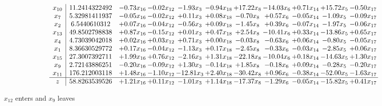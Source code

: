 \documentclass[9pt]{article}
\begin{document}
 \[\begin{array}{c| c c@{\hskip 2pt} c@{\hskip 2pt} c@{\hskip 2pt} c@{\hskip 2pt} c@{\hskip 2pt} c@{\hskip 2pt} c@{\hskip 2pt} c@{\hskip 2pt} c@{\hskip 2pt} }
 x_{10}   &  11.2414322492 & -0.73 x_{16} & -0.02 x_{12} & -1.93 x_{3} & -0.94 x_{18} & + 17.22 x_{8} & -14.03 x_{6} & +  0.71 x_{14} & + 15.72 x_{5} & -0.50 x_{17}\\
 x_{7}   &  5.32981411937 & -0.05 x_{16} & -0.02 x_{12} & +  0.11 x_{3} & +  0.08 x_{18} & -0.70 x_{8} & +  0.57 x_{6} & -0.05 x_{14} & -1.09 x_{5} & -0.09 x_{17}\\
 x_{2}   &  6.5440610312 & +  0.07 x_{16} & -0.04 x_{12} & -0.56 x_{3} & +  0.09 x_{18} & -1.45 x_{8} & +  0.39 x_{6} & -0.07 x_{14} & -1.97 x_{5} & -0.06 x_{17}\\
 x_{13}   &  49.8502798838 & +  0.87 x_{16} & -0.15 x_{12} & +  0.01 x_{3} & +  0.47 x_{18} & +  2.54 x_{8} & -10.41 x_{6} & +  0.33 x_{14} & -13.86 x_{5} & +  0.65 x_{17}\\
 x_{4}   &  4.73039042018 & +  0.02 x_{16} & +  0.03 x_{12} & +  0.71 x_{3} & +  0.00 x_{18} & -0.03 x_{8} & -0.63 x_{6} & +  0.06 x_{14} & -0.80 x_{5} & -0.05 x_{17}\\
 x_{1}   &  8.36630529772 & +  0.17 x_{16} & -0.04 x_{12} & -1.13 x_{3} & +  0.17 x_{18} & -2.45 x_{8} & -0.33 x_{6} & -0.03 x_{14} & -2.85 x_{5} & +  0.06 x_{17}\\
 x_{15}   &  27.3007392711 & +  1.99 x_{16} & +  0.76 x_{12} & -2.16 x_{3} & +  1.31 x_{18} & -22.18 x_{8} & -10.04 x_{6} & +  0.18 x_{14} & -14.63 x_{5} & +  1.30 x_{17}\\
 x_{9}   &  2.72143886251 & -0.20 x_{16} & -0.09 x_{12} & +  1.30 x_{3} & -0.14 x_{18} & +  1.85 x_{8} & -0.18 x_{6} & +  0.09 x_{14} & -0.28 x_{5} & -0.20 x_{17}\\
 x_{11}   &  176.212003118 & +  1.48 x_{16} & -1.10 x_{12} & -12.81 x_{3} & +  2.40 x_{18} & -30.42 x_{8} & +  0.96 x_{6} & -0.38 x_{14} & -52.00 x_{5} & -1.63 x_{17}\\
\hline
z    &  58.8263539526 & +  1.21 x_{16} & +  0.11 x_{12} & -1.01 x_{3} & +  1.14 x_{18} & -17.37 x_{8} & -1.29 x_{6} & -0.05 x_{14} & -15.82 x_{5} & +  0.41 x_{17}\\
\end{array}\]


 $ x_{12} $ enters and $ x_{9} $ leaves 
\end{document}
